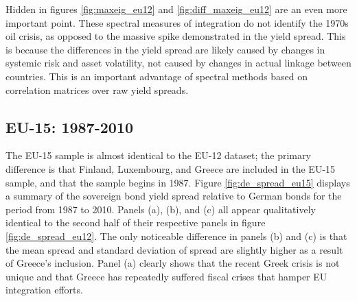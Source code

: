 \documentclass[3p]{elsarticle}
\begin{document}
Hidden in figures \ref{fig:maxeig_eu12} and \ref{fig:diff_maxeig_eu12} are an even more important point.  These spectral measures of integration do not identify the 1970s oil crisis, as opposed to the massive spike demonstrated in the yield spread.  This is because the differences in the yield spread are likely caused by changes in systemic risk and asset volatility, not caused by changes in actual linkage between countries.  This is an important advantage of spectral methods based on correlation matrices over raw yield spreads.

\subsection{EU-15: 1987-2010}
The EU-15 sample is almost identical to the EU-12 dataset; the primary difference is that Finland, Luxembourg, and Greece are included in the EU-15 sample, and that the sample begins in 1987.  Figure \ref{fig:de_spread_eu15} displays a summary of the sovereign bond yield spread relative to German bonds for the period from 1987 to 2010.  Panels (a), (b), and (c) all appear qualitatively identical to the second half of their respective panels in figure \ref{fig:de_spread_eu12}.  The only noticeable difference in panels (b) and (c) is that the mean spread and standard deviation of spread are slightly higher as a result of Greece's inclusion.  Panel (a) clearly shows that the recent Greek crisis is not unique and that Greece has repeatedly suffered fiscal crises that hamper EU integration efforts.
\end{document}
